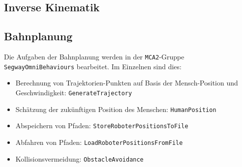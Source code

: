 

\subsection{Inverse Kinematik}
\label{inverse_kinematik_subsec}
\authorsection{\editorjulian}



\subsection{Bahnplanung}
\label{bahnplanung_subsec}
\authorsection{\editortobias}



Die Aufgaben der Bahnplanung werden in der \lstinline{MCA2}-Gruppe \lstinline{SegwayOmniBehaviours} bearbeitet.
Im Einzelnen sind dies:
\begin{itemize}
	\item Berechnung von Trajektorien-Punkten auf Basis der Mensch-Position und Geschwindigkeit: \lstinline{GenerateTrajectory}
	\item Schätzung der zukünftigen Position des Menschen: \lstinline{HumanPosition}
	\item Abspeichern von Pfaden: \lstinline{StoreRoboterPositionsToFile}
	\item Abfahren von Pfaden: \lstinline{LoadRoboterPositionsFromFile}
	\item Kollisionsvermeidung: \lstinline{ObstacleAvoidance}
\end{itemize}

